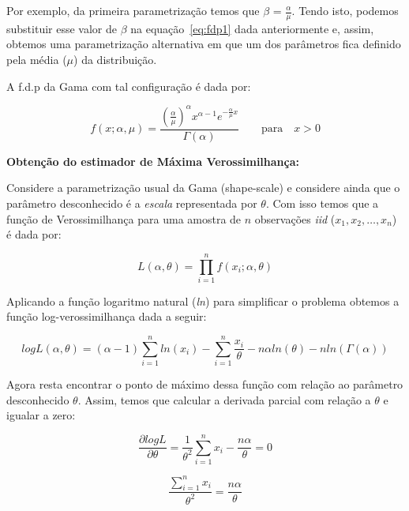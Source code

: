 Por exemplo, da primeira parametrização temos que $\beta$ = $\frac{\alpha}{\mu}$. Tendo isto, podemos substituir esse valor de $\beta$ na equação~\eqref{eq:fdp1} dada anteriormente e, assim, obtemos uma parametrização alternativa em que um dos parâmetros fica definido pela média ($\mu$) da distribuição.

A f.d.p da Gama com tal configuração é dada por:

\begin{equation}
f(x; \alpha, \mu )=\frac{(\frac{\alpha}{\mu})^{\alpha}x^{\alpha-1}e^{-\frac{\alpha}{\mu} x}}{\Gamma(\alpha)} \qquad \text{para} \quad x > 0
\end{equation}

\textbf{Obtenção do estimador de Máxima Verossimilhança:}

Considere a parametrização usual da Gama (shape-scale) e considere ainda que o parâmetro desconhecido é a \textit{escala} representada por $\theta$. Com isso temos que a função de Verossimilhança para uma amostra de $n$ observações \emph{iid} ($x_1, x_2, \dots, x_n$) é dada por:

\begin{equation}
L(\alpha, \theta) = \prod_{i=1}^{n} f(x_i; \alpha, \theta)
\end{equation}

Aplicando a função logaritmo natural (\textit{ln}) para simplificar o problema obtemos  a função log-verossimilhança dada a seguir:

\begin{equation}
logL(\alpha, \theta) = (\alpha-1) \sum_{i=1}^{n} ln(x_i) - \sum_{i=1}^{n} \frac{x_i}{\theta} - n \alpha ln(\theta) - n ln(\Gamma(\alpha))
\end{equation}

Agora resta encontrar o ponto de máximo dessa função com relação ao parâmetro desconhecido $\theta$. Assim, temos que calcular a derivada parcial com relação a $\theta$ e igualar a zero:

\begin{equation}
\frac{\partial logL}{\partial \theta} = \frac{1}{\theta^2}\sum_{i=1}^{n}x_i - \frac{n\alpha}{\theta} = 0
\end{equation}

\begin{equation}
\frac{\sum_{i=1}^{n}x_i}{\theta^2} = \frac{n\alpha}{\theta} 
\end{equation}


